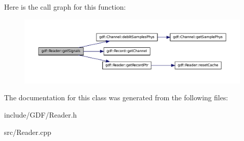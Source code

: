 Here is the call graph for this function:
\nopagebreak
\begin{figure}[H]
\begin{center}
\leavevmode
\includegraphics[width=400pt]{classgdf_1_1_reader_ad1b1edc464cfe23b54c9ffc278677087_cgraph}
\end{center}
\end{figure}




The documentation for this class was generated from the following files:\begin{DoxyCompactItemize}
\item 
include/GDF/Reader.h\item 
src/Reader.cpp\end{DoxyCompactItemize}
